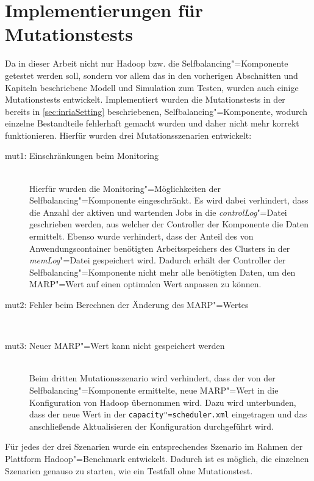 \section{Implementierungen für Mutationstests}
\label{sec:implMutationTests}

Da in dieser Arbeit nicht nur Hadoop bzw. die Selfbalancing"=Komponente getestet werden soll, sondern vor allem das in den vorherigen Abschnitten und Kapiteln beschriebene Modell und Simulation zum Testen, wurden auch einige Mutationstests entwickelt.
Implementiert wurden die Mutationstests in der bereits in \autoref{sec:inriaSetting} beschriebenen, Selfbalancing"=Komponente, wodurch einzelne Bestandteile fehlerhaft gemacht wurden und daher nicht mehr korrekt funktionieren.
Hierfür wurden drei Mutationsszenarien entwickelt:

\begin{description}
    \item [mut1: Einschränkungen beim Monitoring] \hfill \\
        Hierfür wurden die Monitoring"=Möglichkeiten der Selfbalancing"=Komponente eingeschränkt.
        Es wird dabei verhindert, dass die Anzahl der aktiven und wartenden Jobs in die \emph{controlLog}"=Datei geschrieben werden, aus welcher der Controller der Komponente die Daten ermittelt.
        Ebenso wurde verhindert, dass der Anteil des von Anwendungscontainer benötigten Arbeitsspeichers des Clusters in der \emph{memLog}"=Datei gespeichert wird.
        Dadurch erhält der Controller der Selfbalancing"=Komponente nicht mehr alle benötigten Daten, um den \ac{MARP}"=Wert auf einen optimalen Wert anpassen zu können.
    \item [mut2: Fehler beim Berechnen der Änderung des MARP"=Wertes] \hfill \\
        
    \item [mut3: Neuer MARP"=Wert kann nicht gespeichert werden] \hfill \\
        Beim dritten Mutationsszenario wird verhindert, dass der von der Selfbalancing"=Komponente ermittelte, neue MARP"=Wert in die Konfiguration von Hadoop übernommen wird.
        Dazu wird unterbunden, dass der neue Wert in der \texttt{capacity"=scheduler.xml} eingetragen und das anschließende Aktualisieren der Konfiguration durchgeführt wird.
\end{description}

Für jedes der drei Szenarien wurde ein entsprechendes Szenario im Rahmen der Plattform Hadoop"=Benchmark entwickelt.
Dadurch ist es möglich, die einzelnen Szenarien genauso zu starten, wie ein Testfall ohne Mutationstest.
